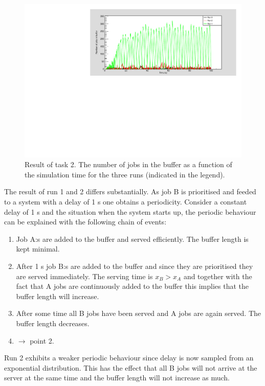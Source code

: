 \documentclass[]{article}
\begin{document}
\begin{figure}[H]
  \centering
  \includegraphics[width=\textwidth]{task2.pdf}
  \caption{Result of task 2. The number of jobs in the buffer as a function of the simulation time for the three runs (indicated in the legend).}
  \label{fig:task2}
\end{figure}

The result of run 1 and 2 differs substantially.
As job B is prioritised and feeded to a system with a delay of 1 s one obtains a periodicity.
Consider a constant delay of 1 s and the situation when the system starts up, the periodic behaviour can be explained with the following chain of events:
\begin{enumerate}
  \item Job A:s are added to the buffer and served efficiently. The buffer length is kept minimal.
  \item After 1 s job B:s are added to the buffer and since they are prioritised they are served immediately. The serving time is $ x_B > x_A $ and together with the fact that A jobs are continuously added to the buffer this implies that the buffer length will increase.
  \item After some time all B jobs have been served and A jobs are again served. The buffer length decreases.
  \item $\rightarrow$ point 2.
\end{enumerate}
Run 2 exhibits a weaker periodic behaviour since delay is now sampled from an exponential distribution.
This has the effect that all B jobs will not arrive at the server at the same time and the buffer length will not increase as much.
\end{document}
